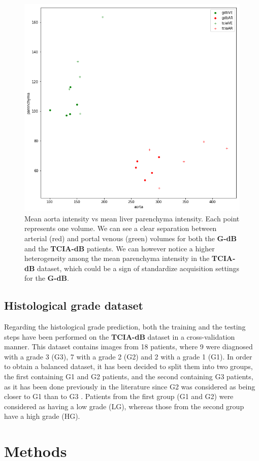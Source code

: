 \documentclass[]{article}
\newcommand{\lmttfont}[1]{{\fontfamily{lmtt}\selectfont #1}}
\begin{document}
\begin{figure}[!ht]
	\centering
	\includegraphics[width=0.6\linewidth]{../Contributions/images/AortaParPlot_Gdb_2}
	\caption{Mean aorta intensity vs mean liver parenchyma intensity. Each point represents one volume. We can see a clear separation between arterial (red) and portal venous (green) volumes for both the \textbf{\lmttfont{G-dB}} and the \textbf{\lmttfont{TCIA-dB}} patients. We can however notice a higher heterogeneity among the mean parenchyma intensity in the \textbf{\lmttfont{TCIA-dB}} dataset, which could be a sign of standardize acquisition settings for the \textbf{\lmttfont{G-dB}}.
	}
	\label{fig:gdbAortaPlot}
\end{figure}


\subsection{Histological grade dataset}

Regarding the histological grade prediction, both the training and the testing steps have been performed on the \textbf{\lmttfont{TCIA-dB}} dataset in a cross-validation manner.
This dataset contains images from 18 patients, where 9 were diagnosed 
with a grade 3 (G3), 7 with a grade 2 (G2) and 2 with a grade 1 (G1). In order
to obtain a balanced dataset, it has been decided to split them
into two groups, the first containing G1 and G2 patients, and the second containing G3 patients, as it has been done previously in the literature since G2
was considered as being closer to G1 than to G3 \cite{Han2013,Zucman-Rossi2015}. Patients from the first group (G1 and G2) were considered as
having a low grade (LG), whereas those from the second group have a high
grade (HG).


\section{Methods}
\end{document}
